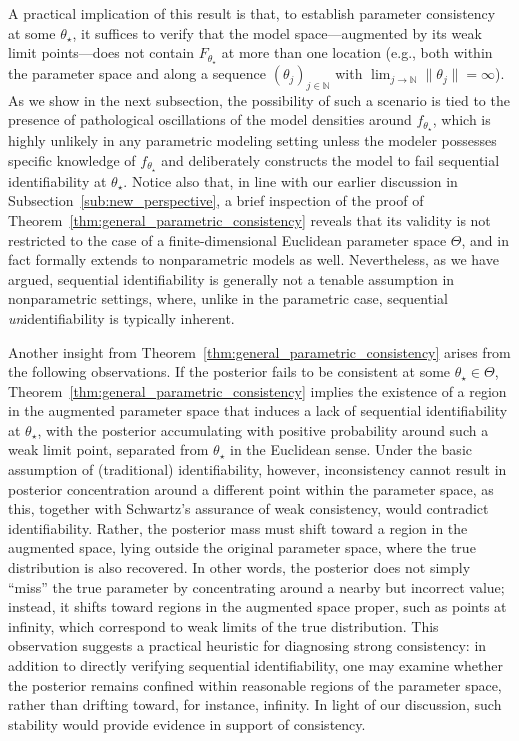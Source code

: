 \documentclass[11pt,twoside]{article}
\begin{document}
A practical implication of this result is that, to establish parameter consistency at some $\theta_\star$, it suffices to verify that the model space—augmented by its weak limit points—does not contain $F_{\theta_\star}$ at more than one location (e.g., both within the parameter space and along a sequence $(\theta_j)_{j \in \mathbb{N}}$ with $\lim_{j\to\mathbb N}\|\theta_j\| = \infty$). As we show in the next subsection, the possibility of such a scenario is tied to the presence of pathological oscillations of the model densities around $f_{\theta_\star}$, which is highly unlikely in any parametric modeling setting unless the modeler possesses specific knowledge of $f_{\theta_\star}$ and deliberately constructs the model to fail sequential identifiability at $\theta_\star$. Notice also that, in line with our earlier discussion in Subsection~\ref{sub:new_perspective}, a brief inspection of the proof of Theorem~\ref{thm:general_parametric_consistency} reveals that its validity is not restricted to the case of a finite-dimensional Euclidean parameter space $\Theta$, and in fact formally extends to nonparametric models as well. Nevertheless, as we have argued, sequential identifiability is generally not a tenable assumption in nonparametric settings, where, unlike in the parametric case, sequential \emph{un}identifiability is typically inherent.




Another insight from Theorem~\ref{thm:general_parametric_consistency} arises from the following observations. If the posterior fails to be consistent at some $\theta_\star \in \Theta$, Theorem~\ref{thm:general_parametric_consistency} implies the existence of a region in the augmented parameter space that induces a lack of sequential identifiability at $\theta_\star$, with the posterior accumulating with positive probability around such a weak limit point, separated from $\theta_\star$ in the Euclidean sense. Under the basic assumption of (traditional) identifiability, however, inconsistency cannot result in posterior concentration around a different point within the parameter space, as this, together with Schwartz's assurance of weak consistency, would contradict identifiability. Rather, the posterior mass must shift toward a region in the augmented space, lying outside the original parameter space, where the true distribution is also recovered. In other words, the posterior does not simply ``miss'' the true parameter by concentrating around a nearby but incorrect value; instead, it shifts toward regions in the augmented space proper, such as points at infinity, which correspond to weak limits of the true distribution. This observation suggests a practical heuristic for diagnosing strong consistency: in addition to directly verifying sequential identifiability, one may examine whether the posterior remains confined within reasonable regions of the parameter space, rather than drifting toward, for instance, infinity. In light of our discussion, such stability would provide evidence in support of consistency.
\end{document}
